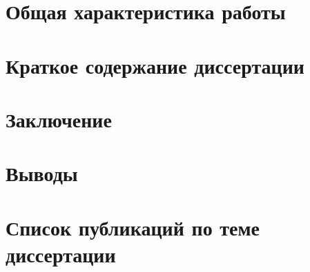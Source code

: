 \documentclass[a5paper,10pt,twoside]{article}
\begin{document}

\section*{Общая характеристика работы}

\section*{Краткое содержание диссертации}

\section*{Заключение}

\section*{Выводы}
\begin{enumerate}
  
\end{enumerate}
\section*{Список публикаций по теме диссертации}
\begin{enumerate}
  
\end{enumerate}

% 


\end{document}
